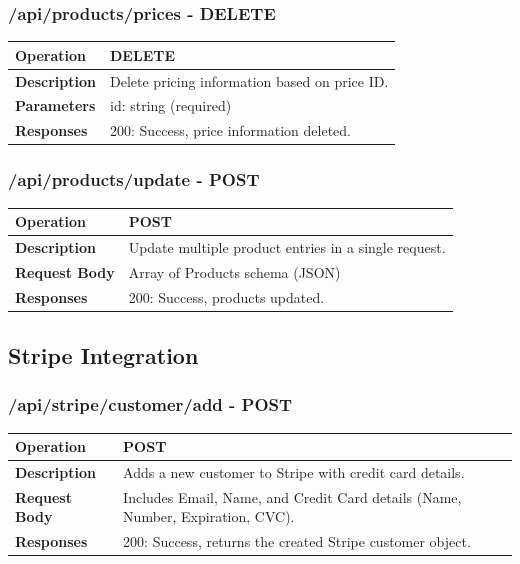 \subsubsection*{/api/products/prices - DELETE}
\begin{tabular}{|>{\raggedright\arraybackslash}p{3cm}|p{12cm}|}
\hline
\textbf{Operation} & DELETE \\
\hline
\textbf{Description} & Delete pricing information based on price ID. \\
\hline
\textbf{Parameters} & id: string (required) \\
\hline
\textbf{Responses} & 200: Success, price information deleted. \\
\hline
\end{tabular}

\subsubsection*{/api/products/update - POST}
\begin{tabular}{|>{\raggedright\arraybackslash}p{3cm}|p{12cm}|}
\hline
\textbf{Operation} & POST \\
\hline
\textbf{Description} & Update multiple product entries in a single request. \\
\hline
\textbf{Request Body} & Array of Products schema (JSON) \\
\hline
\textbf{Responses} & 200: Success, products updated. \\
\hline
\end{tabular}

\subsection{Stripe Integration}

\subsubsection*{/api/stripe/customer/add - POST}
\begin{tabular}{|>{\raggedright\arraybackslash}p{3cm}|p{12cm}|}
\hline
\textbf{Operation} & POST \\
\hline
\textbf{Description} & Adds a new customer to Stripe with credit card details. \\
\hline
\textbf{Request Body} & Includes Email, Name, and Credit Card details (Name, Number, Expiration, CVC). \\
\hline
\textbf{Responses} & 200: Success, returns the created Stripe customer object. \\
\hline
\end{tabular}

